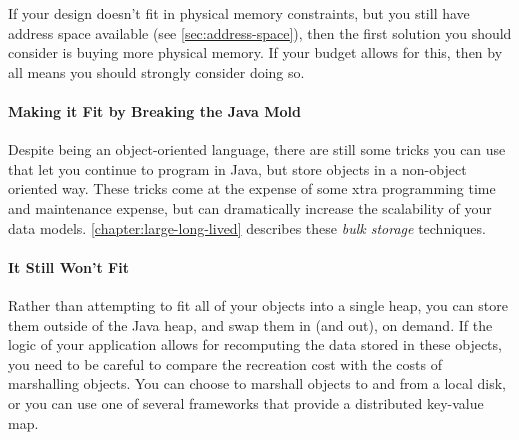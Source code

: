 If your design doesn't fit in physical memory constraints, but you still have
address space available (see \autoref{sec:address-space}), then the first
solution you should consider is buying more physical memory. If your budget
allows for this, then by all means you should strongly consider doing so.


\paragraph{Making it Fit by Breaking the Java Mold} Despite being an
object-oriented language, there are still some tricks you can use that let you
continue to program in Java, but store objects in a non-object oriented way.
These tricks come at the expense of some xtra programming time and maintenance
expense, but can dramatically increase the scalability of your data models.
\autoref{chapter:large-long-lived} describes these \emph{bulk storage}
techniques.

\paragraph{It Still Won't Fit}
Rather than attempting to fit all of your objects into a single heap, you can
store them outside of the Java heap, and swap them in (and out), on demand. If
the logic of your application allows for recomputing the data stored in these
objects, you need to be careful to compare the recreation cost with the costs of
marshalling objects. You can choose to marshall objects to and from a local
disk, or you can use one of several frameworks that provide a distributed
key-value map.
